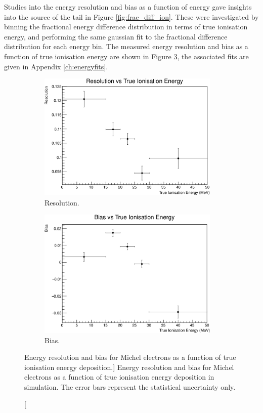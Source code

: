 Studies into the energy resolution and bias as a function of energy gave
insights into the source of the tail in Figure \ref{fig:frac_diff_ion}. These
were investigated by binning the fractional energy difference distribution in
terms of true ionisation energy, and performing the same gaussian fit to the
fractional difference distribution for each energy bin. The measured energy
resolution and bias as a function of true ionisation energy are shown in
Figure \ref{fig:res_and_bias_ion}, the associated fits are given in Appendix
\ref{ch:energyfits}.
\begin{figure}
	\centering
	\begin{subfigure}[b]{\textwidth}
		\centering
		\includegraphics[width=0.95\textwidth]{figures/res_v_energy_ion.pdf}
		\caption {Resolution.}
		\label{fig:res_ion}
	\end{subfigure}
	\begin{subfigure}[b]{\textwidth}
		\centering
		\vspace{5mm}
		\includegraphics[width=0.95\textwidth]{figures/bias_v_energy_ion.pdf}
		\caption {Bias.}
		\label{fig:bias_ion}
	\end{subfigure}
	\caption
	[Energy resolution and bias for Michel electrons as a function of true
	ionisation energy deposition.]
	{Energy resolution and bias for Michel electrons as a function of true
	ionisation energy deposition in \protodune{} simulation. The error bars
	represent the statistical uncertainty only.}
	\label{fig:res_and_bias_ion}
\end{figure}

